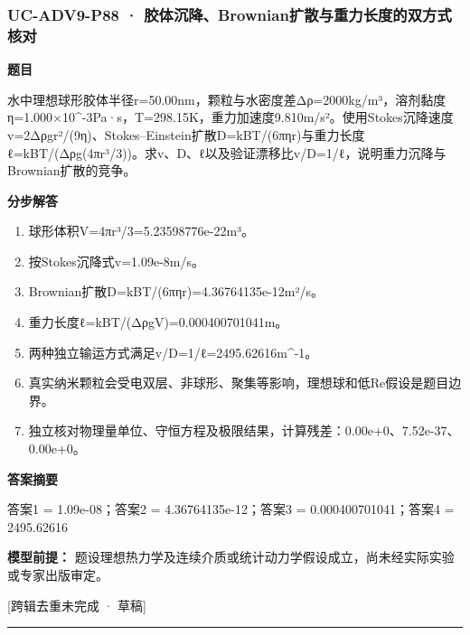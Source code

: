 \documentclass[UTF8,11pt,a4paper]{ctexart}
\begin{document}
\subsubsection*{UC-ADV9-P88 · 胶体沉降、Brownian扩散与重力长度的双方式核对}
\noindent\textbf{题目}\par
水中理想球形胶体半径r=50.00nm，颗粒与水密度差Δρ=2000kg/m³，溶剂黏度η=1.000×10\textasciicircum{}-3Pa·s，T=298.15K，重力加速度9.810m/s²。使用Stokes沉降速度v=2Δρgr²/(9η)、Stokes–Einstein扩散D=kBT/(6πηr)与重力长度ℓ=kBT/(Δρg(4πr³/3))。求v、D、ℓ以及验证漂移比v/D=1/ℓ，说明重力沉降与Brownian扩散的竞争。\par
\medskip\noindent\textbf{分步解答}
\begin{enumerate}
\item 球形体积V=4πr³/3=5.23598776e-22m³。
\item 按Stokes沉降式v=1.09e-8m/s。
\item Brownian扩散D=kBT/(6πηr)=4.36764135e-12m²/s。
\item 重力长度ℓ=kBT/(ΔρgV)=0.000400701041m。
\item 两种独立输运方式满足v/D=1/ℓ=2495.62616m\textasciicircum{}-1。
\item 真实纳米颗粒会受电双层、非球形、聚集等影响，理想球和低Re假设是题目边界。
\item 独立核对物理量单位、守恒方程及极限结果，计算残差：0.00e+0、7.52e-37、0.00e+0。
\end{enumerate}
\noindent\textbf{答案摘要}\par
答案1 = 1.09e-08；答案2 = 4.36764135e-12；答案3 = 0.000400701041；答案4 = 2495.62616\par
\noindent\textbf{模型前提：}
题设理想热力学及连续介质或统计动力学假设成立，尚未经实际实验或专家出版审定。\par
\noindent\textcolor{red!65!black}{[跨辑去重未完成 · 草稿]} \par
\medskip\hrule\medskip
{}
\end{document}

